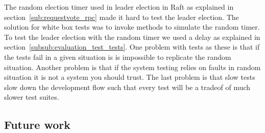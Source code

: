 The random election timer used in leader election in Raft as explained in section~\ref{sub:requestvote_rpc} made it hard to test the leader election. The solution for white box tests was to invoke methods to simulate the random timer. To test the leader election with the random timer we used a delay as explained in section~\ref{subsub:evaluation_test_tests}. One problem with tests as these is that if the tests fail in a given situation is is impossible to replicate the random situation. Another problem is that if the system testing relies on faults in random situation it is not a system you should trust. The last problem is that slow tests slow down the development flow such that every test will be a tradeof of much slower test suites.

\subsection{Future work}



